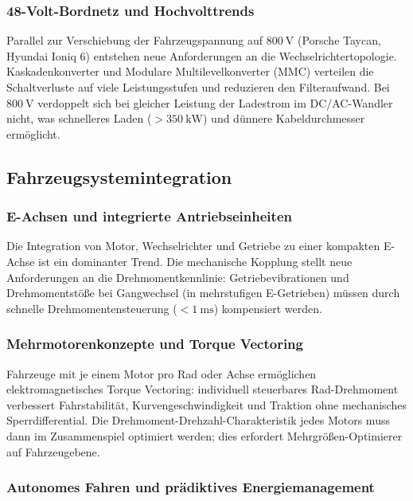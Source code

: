 ﻿\documentclass[a4paper,12pt]{article}
\theoremstyle{definition}
\begin{document}
\subsubsection{48-Volt-Bordnetz und Hochvolttrends}

Parallel zur Verschiebung der Fahrzeugspannung auf $\SI{800}{\volt}$
(Porsche Taycan, Hyundai Ioniq 6) entstehen neue Anforderungen an die
Wechselrichtertopologie. Kaskadenkonverter und Modulare Multilevelkonverter
(MMC) verteilen die Schaltverluste auf viele Leistungsstufen und reduzieren
den Filteraufwand. Bei $\SI{800}{\volt}$ verdoppelt sich bei gleicher Leistung
der Ladestrom im DC/AC-Wandler nicht, was schnelleres Laden ($>\SI{350}{\kilo\watt}$)
und dünnere Kabeldurchmesser ermöglicht.

\subsection{Fahrzeugsystemintegration}

\subsubsection{E-Achsen und integrierte Antriebseinheiten}

Die Integration von Motor, Wechselrichter und Getriebe zu einer kompakten
E-Achse ist ein dominanter Trend. Die mechanische Kopplung stellt neue
Anforderungen an die Drehmomentkennlinie: Getriebevibrationen und
Drehmomentstöße bei Gangwechsel (in mehrstufigen E-Getrieben) müssen durch
schnelle Drehmomentensteuerung ($<\SI{1}{\milli\second}$) kompensiert werden.

\subsubsection{Mehrmotorenkonzepte und Torque Vectoring}

Fahrzeuge mit je einem Motor pro Rad oder Achse ermöglichen elektromagnetisches
Torque Vectoring: individuell steuerbares Rad-Drehmoment verbessert
Fahrstabilität, Kurvengeschwindigkeit und Traktion ohne mechanisches
Sperrdifferential. Die Drehmoment-Drehzahl-Charakteristik jedes Motors muss
dann im Zusammenspiel optimiert werden; dies erfordert Mehrgrößen-Optimierer
auf Fahrzeugebene.

\subsubsection{Autonomes Fahren und prädiktives Energiemanagement}
\end{document}
